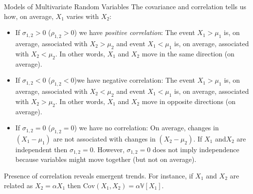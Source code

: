 \documentclass[9pt]{beamer}
\begin{document}
%
\begin{frame}{Models of Multivariate Random Variables}
The covariance and correlation tells us how, on average, $X_1$ varies with $X_2$: 

\begin{block}{}
\begin{itemize}
\item If $\sigma_{1,2}>0$ ($\rho_{1,2}>0$) we have {\em positive correlation}: The event $X_1>\mu_1$  is, on average, associated with $X_2>\mu_2$ and event $X_1<\mu_1$  is, on average, associated with $X_2<\mu_2$.  In other words, $X_1$ and $X_2$ move in the same direction (on average).

\item If $\sigma_{1,2}<0$  ($\rho_{1,2}<0$)we have negative correlation: The event $X_1>\mu_1$  is, on average, associated with $X_2<\mu_2$ and event $X_1<\mu_1$  is, on average, associated with $X_2>\mu_2$. In other words, $X_1$ and $X_2$ move in opposite directions (on average). 

\item If $\sigma_{1,2}=0$ ($\rho_{1,2}=0$) we have no correlation: On average, changes in $(X_1-\mu_1)$ are not associated with changes in $(X_2-\mu_2)$. If $X_1$ and$X_2$ are independent then $\sigma_{1,2}=0$. However, $\sigma_{1,2}=0$ does not imply independence because variables might move together (but not on average).
\end{itemize}
\end{block}
Presence of correlation reveals emergent trends. For instance, if $X_1$ and $X_2$ are related as $X_2=\alpha X_1$ then $\textrm{Cov}(X_1,X_2)=\alpha \mathbb{V}[X_1]$. 

\end{frame}
\end{document}
